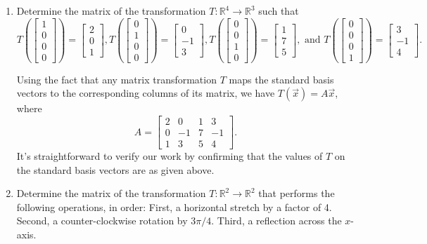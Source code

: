 \documentclass[12pt]{article}
\newcommand{\R}{\mathbb{R}}
\newcommand{\bbm}{\begin{bmatrix}}
\newcommand{\ebm}{\end{bmatrix}}
\begin{document}
\begin{enumerate}
\item Determine the matrix of the transformation $T:\R^4\to \R^3$ such that
\[
 T\left(\bbm 1\\0\\0\\0\ebm\right) = \bbm 2\\0\\1\ebm, T\left(\bbm 0\\1\\0\\0\ebm\right) = \bbm 0\\-1\\3\ebm, T\left(\bbm 0\\0\\1\\0\ebm\right) = \bbm 1\\7\\5\ebm, \text{ and } T\left(\bbm 0\\0\\0\\1\ebm\right) = \bbm 3\\-1\\4\ebm.
\]


Using the fact that any matrix transformation $T$ maps the standard basis vectors to the corresponding columns of its matrix, we have $T(\vec{x})=A\vec{x}$, where
\[
 A = \bbm 2&0&1&3\\0&-1&7&-1\\1&3&5&4\ebm.
\]
It's straightforward to verify our work by confirming that the values of $T$ on the standard basis vectors are as given above.

\pagebreak


\item Determine the matrix of the transformation $T:\R^2\to\R^2$ that performs the following operations, in order:  First, a horizontal stretch by a factor of 4. Second, a counter-clockwise rotation by $3\pi/4$.  Third, a reflection across the $x$-axis.

\bigskip


\end{enumerate}
\end{document}
